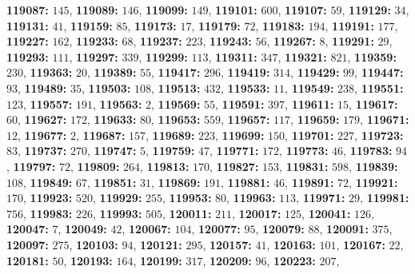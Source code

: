\textsf{\bfseries 119087:} $145$, \textsf{\bfseries 119089:} $146$, \textsf{\bfseries 119099:} $149$, \textsf{\bfseries 119101:} $600$, \textsf{\bfseries 119107:} $59$, \textsf{\bfseries 119129:} $34$, \textsf{\bfseries 119131:} $41$, \textsf{\bfseries 119159:} $85$, \textsf{\bfseries 119173:} $17$, \textsf{\bfseries 119179:} $72$, \textsf{\bfseries 119183:} $194$, \textsf{\bfseries 119191:} $177$, \textsf{\bfseries 119227:} $162$, \textsf{\bfseries 119233:} $68$, \textsf{\bfseries 119237:} $223$, \textsf{\bfseries 119243:} $56$, \textsf{\bfseries 119267:} $8$, \textsf{\bfseries 119291:} $29$, \textsf{\bfseries 119293:} $111$, \textsf{\bfseries 119297:} $339$, \textsf{\bfseries 119299:} $113$, \textsf{\bfseries 119311:} $347$, \textsf{\bfseries 119321:} $821$, \textsf{\bfseries 119359:} $230$, \textsf{\bfseries 119363:} $20$, \textsf{\bfseries 119389:} $55$, \textsf{\bfseries 119417:} $296$, \textsf{\bfseries 119419:} $314$, \textsf{\bfseries 119429:} $99$, \textsf{\bfseries 119447:} $93$, \textsf{\bfseries 119489:} $35$, \textsf{\bfseries 119503:} $108$, \textsf{\bfseries 119513:} $432$, \textsf{\bfseries 119533:} $11$, \textsf{\bfseries 119549:} $238$, \textsf{\bfseries 119551:} $123$, \textsf{\bfseries 119557:} $191$, \textsf{\bfseries 119563:} $2$, \textsf{\bfseries 119569:} $55$, \textsf{\bfseries 119591:} $397$, \textsf{\bfseries 119611:} $15$, \textsf{\bfseries 119617:} $60$, \textsf{\bfseries 119627:} $172$, \textsf{\bfseries 119633:} $80$, \textsf{\bfseries 119653:} $559$, \textsf{\bfseries 119657:} $117$, \textsf{\bfseries 119659:} $179$, \textsf{\bfseries 119671:} $12$, \textsf{\bfseries 119677:} $2$, \textsf{\bfseries 119687:} $157$, \textsf{\bfseries 119689:} $223$, \textsf{\bfseries 119699:} $150$, \textsf{\bfseries 119701:} $227$, \textsf{\bfseries 119723:} $83$, \textsf{\bfseries 119737:} $270$, \textsf{\bfseries 119747:} $5$, \textsf{\bfseries 119759:} $47$, \textsf{\bfseries 119771:} $172$, \textsf{\bfseries 119773:} $46$, \textsf{\bfseries 119783:} $94$, \textsf{\bfseries 119797:} $72$, \textsf{\bfseries 119809:} $264$, \textsf{\bfseries 119813:} $170$, \textsf{\bfseries 119827:} $153$, \textsf{\bfseries 119831:} $598$, \textsf{\bfseries 119839:} $108$, \textsf{\bfseries 119849:} $67$, \textsf{\bfseries 119851:} $31$, \textsf{\bfseries 119869:} $191$, \textsf{\bfseries 119881:} $46$, \textsf{\bfseries 119891:} $72$, \textsf{\bfseries 119921:} $170$, \textsf{\bfseries 119923:} $520$, \textsf{\bfseries 119929:} $255$, \textsf{\bfseries 119953:} $80$, \textsf{\bfseries 119963:} $113$, \textsf{\bfseries 119971:} $29$, \textsf{\bfseries 119981:} $756$, \textsf{\bfseries 119983:} $226$, \textsf{\bfseries 119993:} $505$, \textsf{\bfseries 120011:} $211$, \textsf{\bfseries 120017:} $125$, \textsf{\bfseries 120041:} $126$, \textsf{\bfseries 120047:} $7$, \textsf{\bfseries 120049:} $42$, \textsf{\bfseries 120067:} $104$, \textsf{\bfseries 120077:} $95$, \textsf{\bfseries 120079:} $88$, \textsf{\bfseries 120091:} $375$, \textsf{\bfseries 120097:} $275$, \textsf{\bfseries 120103:} $94$, \textsf{\bfseries 120121:} $295$, \textsf{\bfseries 120157:} $41$, \textsf{\bfseries 120163:} $101$, \textsf{\bfseries 120167:} $22$, \textsf{\bfseries 120181:} $50$, \textsf{\bfseries 120193:} $164$, \textsf{\bfseries 120199:} $317$, \textsf{\bfseries 120209:} $96$, \textsf{\bfseries 120223:} $207$, 
